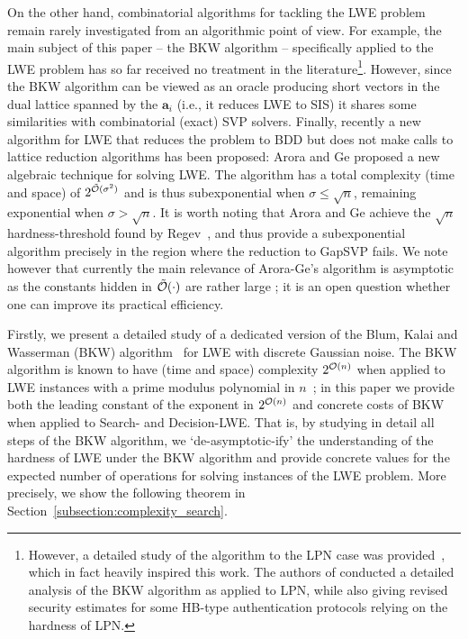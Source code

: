 On the other hand, combinatorial algorithms for tackling the LWE problem remain rarely investigated from an algorithmic point of view. For example, the main subject of this paper -- the BKW algorithm -- specifically applied to the LWE problem has so far received no treatment in the literature\footnote{However, a detailed study of the algorithm to the LPN case was provided~\cite{FL06}, which in fact heavily inspired this work. The authors of \cite{FL06} conducted a detailed analysis of the BKW algorithm as applied to LPN, while also giving revised security estimates for some HB-type authentication protocols relying on the hardness of LPN.}. However, since the BKW algorithm can be viewed as an oracle producing short vectors in the dual lattice spanned by the $\mathbf{a}_i$ (i.e., it reduces LWE to SIS) it shares some similarities with combinatorial (exact) SVP solvers. Finally, recently a new algorithm for LWE that reduces the problem to BDD but does not make calls to lattice reduction algorithms has been proposed: Arora and Ge \cite{arora-ge:icalp2011} proposed a new algebraic technique for solving LWE. The algorithm has a total complexity (time and space) of $2^{\tilde{\mathcal{O}}(\sigma^2)}$ and is thus subexponential when $\sigma \leq \sqrt{n}$, remaining exponential when $\sigma > \sqrt{n}$. It is worth noting that Arora and Ge achieve the $\sqrt{n}$ hardness-threshold found by Regev~\cite{regev:acm09}, and thus provide a subexponential algorithm precisely in the region where the reduction to GapSVP fails. We note however that currently the main relevance of Arora-Ge's algorithm is asymptotic as the constants hidden in $\tilde{\mathcal{O}}(\cdot)$ are rather large \cite{SCC12_AG}; it is an open question whether one can improve its practical efficiency.

 Firstly, we present a detailed study of a dedicated version of the Blum, Kalai and Wasserman (BKW) algorithm~\cite{DBLP:journals/jacm/BlumKW03} for LWE with discrete Gaussian noise. The BKW algorithm is known to have (time and space) complexity $2^{\mathcal{O}\left(n\right)}$ when applied to LWE instances with a prime modulus polynomial in $n$~\cite{regev:acm09}; in this paper we provide both the leading constant of the exponent in $2^{\mathcal{O}\left(n\right)}$ and concrete costs of BKW when applied to Search- and Decision-LWE. That is, by studying in detail all steps of the BKW algorithm, we `de-asymptotic-ify' the understanding of the hardness of LWE under the BKW algorithm and provide concrete values for the expected number of operations for solving instances of the LWE problem.  More precisely, we show the following theorem in Section~\ref{subsection:complexity_search}.

